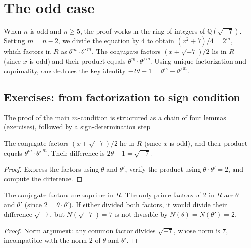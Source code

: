 \section{The odd case}

When $n$ is odd and $n \geq 5$, the proof works in the ring of integers of
$\mathbb{Q}(\sqrt{-7})$. Setting $m = n - 2$, we divide the equation by $4$
to obtain $(x^2 + 7)/4 = 2^m$, which factors in $R$ as
$\theta^m \cdot \theta'^{\,m}$.
The conjugate factors $(x \pm \sqrt{-7})/2$ lie in $R$ (since $x$ is odd) and
their product equals $\theta^m \cdot \theta'^{\,m}$. Using unique factorization
and coprimality, one deduces the key identity $-2\theta + 1 = \theta^m - \theta'^{\,m}$.

\subsection{Exercises: from factorization to sign condition}

The proof of the main $m$-condition is structured as a chain of four
lemmas (exercises), followed by a sign-determination step.

\begin{lemma}
  \label{lem:factors_in_R_with_product}
  \leanok
  The conjugate factors $(x \pm \sqrt{-7})/2$ lie in $R$ (since $x$ is odd),
  and their product equals $\theta^m \cdot \theta'^{\,m}$.
  Their difference is $2\theta - 1 = \sqrt{-7}$.
\end{lemma}
\begin{proof}\leanok
  Express the factors using $\theta$ and $\theta'$, verify the product
  using $\theta \cdot \theta' = 2$, and compute the difference.
\end{proof}

\begin{lemma}[Coprimality]
  \label{lem:conjugate_factors_coprime}
  \leanok
  The conjugate factors are coprime in $R$.
  The only prime factors of $2$ in $R$ are $\theta$ and $\theta'$
  (since $2 = \theta \cdot \theta'$). If either divided both factors,
  it would divide their difference $\sqrt{-7}$, but $N(\sqrt{-7}) = 7$ is
  not divisible by $N(\theta) = N(\theta') = 2$.
\end{lemma}
\begin{proof}\leanok
  Norm argument: any common factor divides $\sqrt{-7}$, whose norm is $7$,
  incompatible with the norm $2$ of $\theta$ and $\theta'$.
\end{proof}

